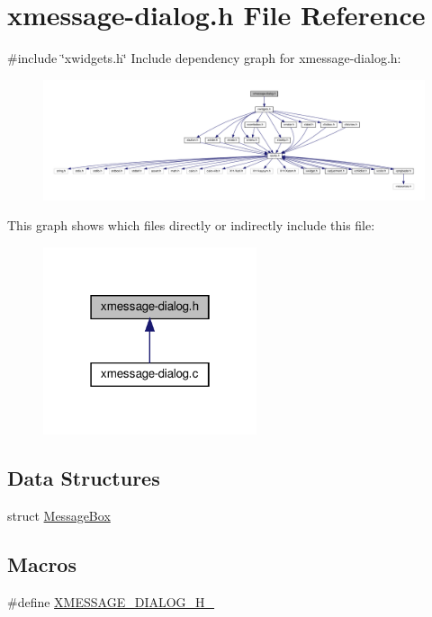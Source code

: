 \hypertarget{xmessage-dialog_8h}{}\section{xmessage-\/dialog.h File Reference}
\label{xmessage-dialog_8h}
{\ttfamily \#include \char`\"{}xwidgets.\+h\char`\"{}}\newline
Include dependency graph for xmessage-\/dialog.h\+:
\nopagebreak
\begin{figure}[H]
\begin{center}
\leavevmode
\includegraphics[width=350pt]{xmessage-dialog_8h__incl}
\end{center}
\end{figure}
This graph shows which files directly or indirectly include this file\+:
\nopagebreak
\begin{figure}[H]
\begin{center}
\leavevmode
\includegraphics[width=178pt]{xmessage-dialog_8h__dep__incl}
\end{center}
\end{figure}
\subsection*{Data Structures}
\begin{DoxyCompactItemize}
\item 
struct \hyperlink{structMessageBox}{Message\+Box}
\end{DoxyCompactItemize}
\subsection*{Macros}
\begin{DoxyCompactItemize}
\item 
\#define \hyperlink{xmessage-dialog_8h_ae6a5fb28cf95e12496905a44e040ce2f}{X\+M\+E\+S\+S\+A\+G\+E\+\_\+\+D\+I\+A\+L\+O\+G\+\_\+\+H\+\_\+}
\end{DoxyCompactItemize}

